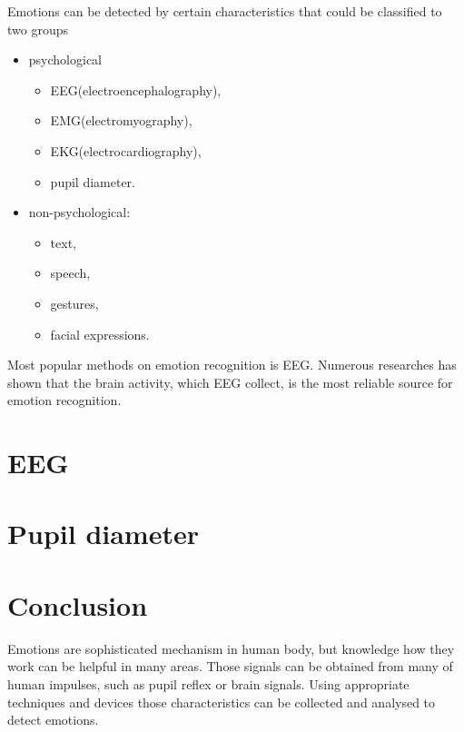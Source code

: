 \documentclass[10pt,journal,compsoc,twoside]{IEEEtran}
\begin{document}
Emotions can be detected by certain characteristics that could be classified to two groups \cite{CalvoDMello2010}
\begin{itemize}
	\item psychological
	\begin{itemize}
		\item EEG(electroencephalography),
		\item EMG(electromyography), 
		\item EKG(electrocardiography), 
		\item pupil diameter.
	\end{itemize} 
	\item non-psychological: 
	\begin{itemize} 
		\item text, 
		\item speech,
		\item  gestures, 
		\item facial expressions.
	\end{itemize}
\end{itemize}

Most popular methods on emotion recognition is EEG. Numerous researches\cite{LinMusic,GaoMehmood,NieWangShiLu} has shown that the brain activity, which EEG collect, is the most reliable source for emotion recognition. 




\section{EEG}
\section{Pupil diameter}

\section{Conclusion}
Emotions are sophisticated mechanism in human body, but knowledge how they work can be helpful in many areas. Those signals can be obtained from many of human impulses, such as pupil reflex or brain signals. Using appropriate techniques and devices those characteristics can be collected and analysed to detect emotions.
	
\end{document}
